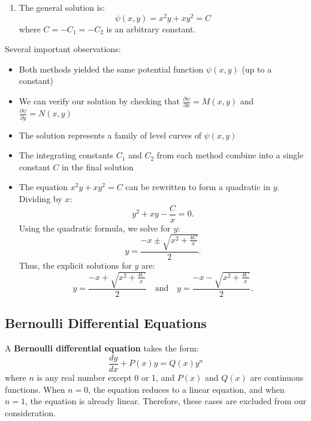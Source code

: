 \begin{example}
\begin{solution}
\begin{enumerate}
   Now find $g(x)$ by comparing $\frac{\partial \psi}{\partial x}$ with $M(x,y)$:
   \begin{align*}
   \frac{\partial \psi}{\partial x} &= 2xy + y^2 + g'(x) = M(x,y) = 2xy + y^2 \\
   \therefore g'(x) &= 0 \\
   \therefore g(x) &= C_2
   \end{align*}
   
   Thus, by Method 2:
   \[
   \psi(x,y) = x^2y + xy^2 + C_2
   \]

\item The general solution is:
   \[
   \psi(x,y) = x^2y + xy^2 = C
   \]
   where $C = -C_1 = -C_2$ is an arbitrary constant.
\end{enumerate}

\noindent Several important observations:
\begin{itemize}
   \item Both methods yielded the same potential function $\psi(x,y)$ (up to a constant)
   \item We can verify our solution by checking that $\frac{\partial \psi}{\partial x} = M(x,y)$ and $\frac{\partial \psi}{\partial y} = N(x,y)$
   \item The solution represents a family of level curves of $\psi(x,y)$
   \item The integrating constants $C_1$ and $C_2$ from each method combine into a single constant $C$ in the final solution
\item The equation \(x^2y + xy^2 = C\) can be rewritten to form a quadratic in \(y\). Dividing by \(x\):
\[
y^2 + xy - \frac{C}{x} = 0.
\]
Using the quadratic formula, we solve for \(y\):
\[
y = \frac{-x \pm \sqrt{x^2 + \frac{4C}{x}}}{2}.
\]
Thus, the explicit solutions for \(y\) are:
\[
y = \frac{-x + \sqrt{x^2 + \frac{4C}{x}}}{2} \quad \text{and} \quad y = \frac{-x - \sqrt{x^2 + \frac{4C}{x}}}{2}.
\]


\end{itemize}
\end{solution}
\end{example}
\exampleline

\subsection*{Bernoulli Differential Equations} 

\noindent A \textbf{Bernoulli differential equation} takes the form:
\[
\frac{dy}{dx} + P(x)y = Q(x)y^n
\]
where $n$ is any real number except 0 or 1, and $P(x)$ and $Q(x)$ are continuous functions. When $n = 0$, the equation reduces to a linear equation, and when $n = 1$, the equation is already linear. Therefore, these cases are excluded from our consideration. \\

